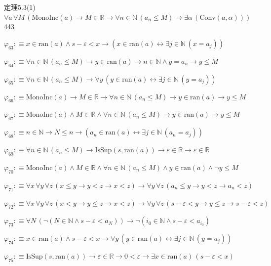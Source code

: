 \begin{fullproof}{定理5.3(1)}{$\forall a\,\forall M\,(\mathrm{MonoInc}(a) \to M \in \mathbb{R} \to \forall n \in \mathbb{N}\,(a_{n} \leq M) \to \exists \alpha\,(\mathrm{Conv}(a,\alpha)))$}{443}
\begin{abbrevlist}
\item $\varphi_{63} :\equiv x \in \mathrm{ran}(a) \land s - \varepsilon < x \to (x \in \mathrm{ran}(a) \leftrightarrow \exists j \in \mathbb{N}\,(x = a_{j}))$
\item $\varphi_{64} :\equiv \forall n \in \mathbb{N}\,(a_{n} \leq M) \to y \in \mathrm{ran}(a) \to n \in \mathbb{N} \land y = a_{n} \to y \leq M$
\item $\varphi_{65} :\equiv \forall n \in \mathbb{N}\,(a_{n} \leq M) \to \forall y\,(y \in \mathrm{ran}(a) \leftrightarrow \exists j \in \mathbb{N}\,(y = a_{j}))$
\item $\varphi_{66} :\equiv \mathrm{MonoInc}(a) \to M \in \mathbb{R} \to \forall n \in \mathbb{N}\,(a_{n} \leq M) \to y \in \mathrm{ran}(a) \to y \leq M$
\item $\varphi_{67} :\equiv \mathrm{MonoInc}(a) \land M \in \mathbb{R} \land \forall n \in \mathbb{N}\,(a_{n} \leq M) \to y \in \mathrm{ran}(a) \to y \leq M$
\item $\varphi_{68} :\equiv n \in \mathbb{N} \to N \leq n \to (a_{n} \in \mathrm{ran}(a) \leftrightarrow \exists j \in \mathbb{N}\,(a_{n} = a_{j}))$
\item $\varphi_{69} :\equiv \forall n \in \mathbb{N}\,(a_{n} \leq M) \to \mathrm{IsSup}(s,\mathrm{ran}(a)) \to \varepsilon \in \mathbb{R} \to \varepsilon \in \mathbb{R}$
\item $\varphi_{70} :\equiv \mathrm{MonoInc}(a) \land M \in \mathbb{R} \land \forall n \in \mathbb{N}\,(a_{n} \leq M) \land y \in \mathrm{ran}(a) \land \neg y \leq M$
\item $\varphi_{71} :\equiv \forall x\,\forall y\,\forall z\,(x \leq y \to y < z \to x < z) \to \forall y\,\forall z\,(a_{n} \leq y \to y < z \to a_{n} < z)$
\item $\varphi_{72} :\equiv \forall x\,\forall y\,\forall z\,(x < y \to y \leq z \to x < z) \to \forall y\,\forall z\,(s - \varepsilon < y \to y \leq z \to s - \varepsilon < z)$
\item $\varphi_{73} :\equiv \forall N\,(\neg (N \in \mathbb{N} \land s - \varepsilon < a_{N})) \to \neg (i_{0} \in \mathbb{N} \land s - \varepsilon < a_{i_{0}})$
\item $\varphi_{74} :\equiv x \in \mathrm{ran}(a) \land s - \varepsilon < x \to \forall y\,(y \in \mathrm{ran}(a) \leftrightarrow \exists j \in \mathbb{N}\,(y = a_{j}))$
\item $\varphi_{75} :\equiv \mathrm{IsSup}(s,\mathrm{ran}(a)) \to \varepsilon \in \mathbb{R} \to 0 < \varepsilon \to \exists x \in \mathrm{ran}(a)\,(s - \varepsilon < x)$

\end{abbrevlist}
\end{fullproof}
